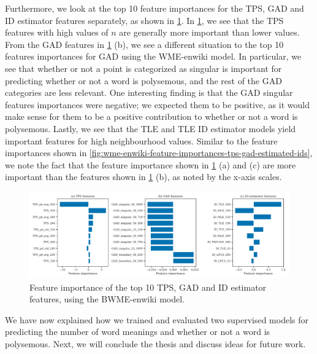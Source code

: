 Furthermore, we look at the top 10 feature importances for the TPS, GAD and ID estimator features separately, as shown in \cref{fig:bwme-enwiki-feature-importances-tps-gad-estimated-ids}. In \cref{fig:bwme-enwiki-feature-importances-tps-gad-estimated-ids}, we see that the TPS features with high values of $n$ are generally more important than lower values. From the GAD features in \cref{fig:bwme-enwiki-feature-importances-tps-gad-estimated-ids} (b), we see a different situation to the top 10 features importances for GAD using the WME-enwiki model. In particular, we see that whether or not a point is categorized as singular is important for predicting whether or not a word is polysemous, and the rest of the GAD categories are less relevant. One interesting finding is that the GAD singular features importances were negative; we expected them to be positive, as it would make sense for them to be a positive contribution to whether or not a word is polysemous. Lastly, we see that the TLE and TLE ID estimator models yield important features for high neighbourhood values. Similar to the feature importances shown in \cref{fig:wme-enwiki-feature-importances-tps-gad-estimated-ids}, we note the fact that the feature importance shown in \cref{fig:bwme-enwiki-feature-importances-tps-gad-estimated-ids} (a) and (c) are more important than the features shown in \cref{fig:bwme-enwiki-feature-importances-tps-gad-estimated-ids} (b), as noted by the x-axis scales.
\begin{figure}[H]
    \centering
    \includegraphics[width=\textwidth]{thesis/figures/bwme-enwiki-top-10-feature-importances-tps-gad-estimated-ids.pdf}
    \caption{Feature importance of the top 10 TPS, GAD and ID estimator features, using the BWME-enwiki model.}
    \label{fig:bwme-enwiki-feature-importances-tps-gad-estimated-ids}
\end{figure}

We have now explained how we trained and evaluated two supervised models for predicting the number of word meanings and whether or not a word is polysemous. Next, we will conclude the thesis and discuss ideas for future work.